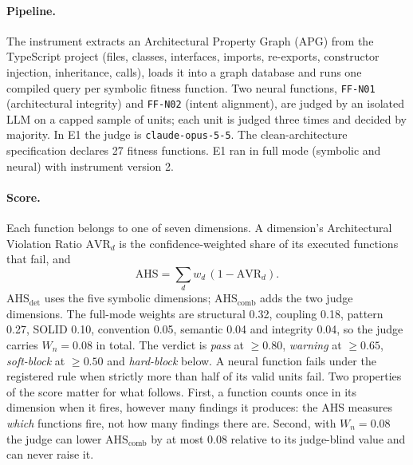 \documentclass[10pt,a4paper]{article}
\newcommand{\ff}[1]{\texttt{\small #1}}
\newcommand{\AHSc}{\mathrm{AHS}_{\mathrm{comb}}}
\newcommand{\AHSd}{\mathrm{AHS}_{\mathrm{det}}}
\begin{document}
\paragraph{Pipeline.} The instrument extracts an Architectural Property Graph (APG) from the TypeScript project
(files, classes, interfaces, imports, re-exports, constructor injection, inheritance, calls), loads it into a graph
database and runs one compiled query per symbolic fitness function. Two neural functions, \ff{FF-N01}
(architectural integrity) and \ff{FF-N02} (intent alignment), are judged by an isolated LLM on a capped sample of
units; each unit is judged three times and decided by majority. %
In E1 the judge is \texttt{claude-opus-5-5}. %
The clean-architecture specification declares 27 fitness functions. %
E1 ran in full mode (symbolic and neural) with instrument version 2. %

\paragraph{Score.} Each function belongs to one of seven dimensions. A dimension's Architectural Violation Ratio
$\mathrm{AVR}_d$ is the confidence-weighted share of its executed functions that fail, and
\begin{equation}
  \mathrm{AHS} = \sum_d w_d\,(1 - \mathrm{AVR}_d).
\end{equation}
$\AHSd$ uses the five symbolic dimensions; $\AHSc$ adds the two judge dimensions. The full-mode weights are
structural 0.32, coupling 0.18, pattern 0.27, SOLID 0.10, convention 0.05, semantic 0.04 and integrity 0.04, so the
judge carries $W_n = 0.08$ in total. The verdict is \emph{pass} at $\geq 0.80$, \emph{warning} at $\geq 0.65$,
\emph{soft-block} at $\geq 0.50$ and \emph{hard-block} below.
A neural function fails under the registered rule when strictly more than half of its valid units fail.
Two properties of the score matter for what follows. First, a function counts once in its dimension when it fires,
however many findings it produces: the AHS measures \emph{which} functions fire, not how many findings there are.
Second, with $W_n = 0.08$ the judge can lower $\AHSc$ by at most 0.08 relative to its judge-blind value and can
never raise it. %
\end{document}
